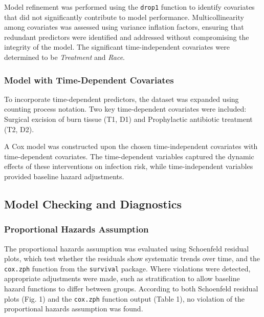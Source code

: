 \documentclass[12pt]{article}
\begin{document}
Model refinement was performed using the \texttt{drop1} function to identify covariates that did not significantly contribute to model performance. Multicollinearity among covariates was assessed using variance inflation factors, ensuring that redundant predictors were identified and addressed without compromising the integrity of the model. The significant time-independent covariates were determined to be \textit{Treatment} and \textit{Race}. 

\subsubsection*{Model with Time-Dependent Covariates}

To incorporate time-dependent predictors, the dataset was expanded using counting process notation. Two key time-dependent covariates were included: Surgical excision of burn tissue (T1, D1) and Prophylactic antibiotic treatment (T2, D2).

A Cox model was constructed upon the chosen time-independent covariates with time-dependent covariates. The time-dependent variables captured the dynamic effects of these interventions on infection risk, while time-independent variables provided baseline hazard adjustments.

\subsection*{Model Checking and Diagnostics}

\subsubsection*{Proportional Hazards Assumption}

The proportional hazards assumption was evaluated using Schoenfeld residual plots, which test whether the residuals show systematic trends over time, and the \texttt{cox.zph} function from the \texttt{survival} package. Where violations were detected, appropriate adjustments were made, such as stratification to allow baseline hazard functions to differ between groups. According to both Schoenfeld residual plots (Fig. 1) and the \texttt{cox.zph} function output (Table 1), no violation of the proportional hazards assumption was found. 
\end{document}
